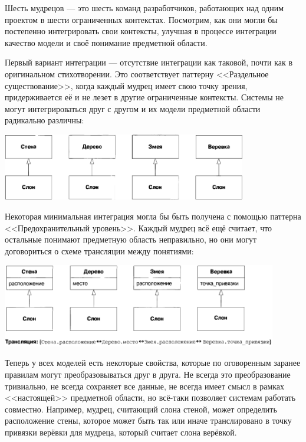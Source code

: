 \documentclass{../../text-style}
\begin{document}
Шесть мудрецов --- это шесть команд разработчиков, работающих над одним проектом в шести ограниченных контекстах. Посмотрим, как они могли бы постепенно интегрировать свои контексты, улучшая в процессе интеграции качество модели и своё понимание предметной области.

Первый вариант интеграции --- отсутствие интеграции как таковой, почти как в оригинальном стихотворении. Это соответствует паттерну <<Раздельное существование>>, когда каждый мудрец имеет свою точку зрения, придерживается её и не лезет в другие ограниченные контексты. Системы не могут интегрироваться друг с другом и их модели предметной области радикально различны:

\begin{center}
    \includegraphics[width=0.8\textwidth]{elephantSeparateWays.png}
\end{center}

Некоторая минимальная интеграция могла бы быть получена с помощью паттерна <<Предохранительный уровень>>. Каждый мудрец всё ещё считает, что остальные понимают предметную область неправильно, но они могут договориться о схеме трансляции между понятиями: 

\begin{center}
    \includegraphics[width=0.9\textwidth]{elephantAnticorruptionLayer.png}
\end{center}

Теперь у всех моделей есть некоторые свойства, которые по оговоренным заранее правилам могут преобразовываться друг в друга. Не всегда это преобразование тривиально, не всегда сохраняет все данные, не всегда имеет смысл в рамках <<настоящей>> предметной области, но всё-таки позволяет системам работать совместно. Например, мудрец, считающий слона стеной, может определить расположение стены, которое может быть так или иначе транслировано в точку привязки верёвки для мудреца, который считает слона верёвкой. 
\end{document}
